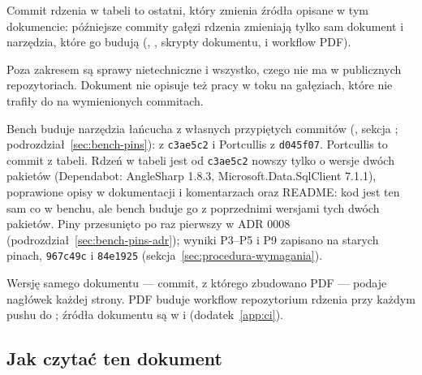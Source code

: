 Commit rdzenia w tabeli to ostatni, który zmienia źródła opisane w tym dokumencie:
późniejsze commity gałęzi  rdzenia zmieniają tylko sam dokument i narzędzia,
które go budują (, , skrypty dokumentu,
 i workflow PDF).

Poza zakresem są sprawy nietechniczne i wszystko, czego nie ma w publicznych
repozytoriach. Dokument nie opisuje też pracy w toku na gałęziach, które nie trafiły do
 na wymienionych commitach.

Bench buduje narzędzia łańcucha z własnych przypiętych commitów (, sekcja
; podrozdział~\ref{sec:bench-pins}):  z \texttt{c3ae5c2}
i Portcullis z \texttt{d045f07}. Portcullis to commit z tabeli. Rdzeń w tabeli jest od
\texttt{c3ae5c2} nowszy tylko o wersje dwóch pakietów (Dependabot: AngleSharp 1.8.3,
Microsoft.Data.SqlClient 7.1.1), poprawione opisy w dokumentacji i komentarzach oraz README:
kod jest ten sam co w benchu, ale bench buduje go z poprzednimi wersjami tych dwóch pakietów.
Piny przesunięto po raz pierwszy w ADR 0008 (podrozdział~\ref{sec:bench-pins-adr}); wyniki P3--P5
i P9 zapisano na starych pinach, \texttt{967c49c} i \texttt{84e1925} (sekcja~\ref{sec:procedura-wymagania}).

Wersję samego dokumentu --- commit, z którego zbudowano PDF --- podaje nagłówek każdej
strony. PDF buduje workflow  repozytorium
rdzenia przy każdym pushu do ; źródła dokumentu są w
 i  (dodatek~\ref{app:ci}).


\subsection{Jak czytać ten dokument}\label{sec:wprowadzenie-czytanie}

